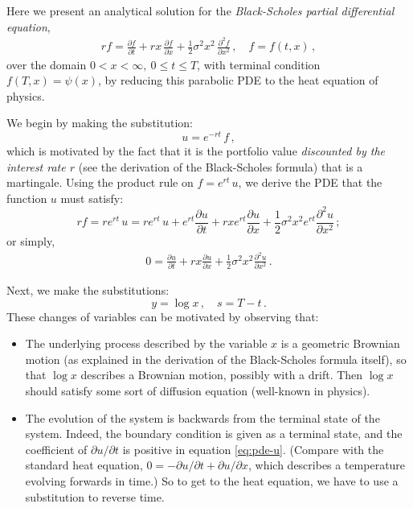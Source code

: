 \documentclass[12pt]{article}
\providecommand{\defnterm}[1]{\emph{#1}}
\providecommand{\pd}[2]{\frac{\partial #1}{\partial #2}}
\providecommand{\pdd}[2]{\frac{\partial^2 #1}{\partial #2}}
\providecommand{\ipd}[2]{\partial #1 / \partial #2}
\begin{document}

Here we present
an analytical 
solution for the \defnterm{Black-Scholes partial differential equation},
\begin{align}\label{eq:bs-pde}
rf = \pd{f}{t} + rx \, \pd{f}{x} + \frac12 \sigma^2 x^2 \, \pdd{f}{x^2}\,,
\quad f = f(t,x)\,, 
\end{align}
over the domain $0 < x < \infty, \: 0 \leq t \leq T$,
with terminal condition $f(T,x) = \psi(x)$,
by reducing this parabolic PDE to
the heat equation of physics.

We begin by making the substitution:
\[
u = e^{-rt} \, f\,,
\]
which is motivated by the fact that it is the portfolio value
\emph{discounted by the interest rate $r$} (see the derivation of the 
Black-Scholes formula)
that  is a martingale.
Using the product rule on $f = e^{rt} \, u$,
we derive the PDE that the function $u$ must satisfy:
\[
rf = re^{rt} \, u = re^{rt} \, u + e^{rt} \pd{u}{t}
+ rx e^{rt} \pd{u}{x} + \frac12 \sigma^2 x^2 e^{rt} \pdd{u}{x^2}\,;
\]
or simply,
\begin{align}\label{eq:pde-u}
0 = \pd{u}{t} + rx \pd{u}{x} + \frac12 \sigma^2 x^2 \pdd{u}{x^2}\,.
\end{align}

Next, we make the substitutions:
\[
y = \log x\,, \quad s = T-t\,.
\]
These changes of variables can be motivated
by observing that:
\begin{itemize}
\item
The underlying process described by the variable $x$
is a geometric Brownian motion
(as explained in the derivation of the Black-Scholes formula itself),
so that $\log x$ describes a Brownian motion, possibly
with a drift.
Then $\log x$ should satisfy some sort of diffusion equation
(well-known in physics).
\item
The evolution of the system
is backwards from the terminal state of the system.  Indeed,
the boundary condition is given as a terminal state,
and the coefficient of $\ipd{u}{t}$ is positive in equation \eqref{eq:pde-u}.
(Compare with the standard heat equation,
$0 = -\ipd{u}{t} + \ipd{u}{x}$, which describes a
temperature  evolving forwards in time.)
So to get to the heat equation, 
we have to use a substitution to reverse time.
\end{itemize}
\end{document}
